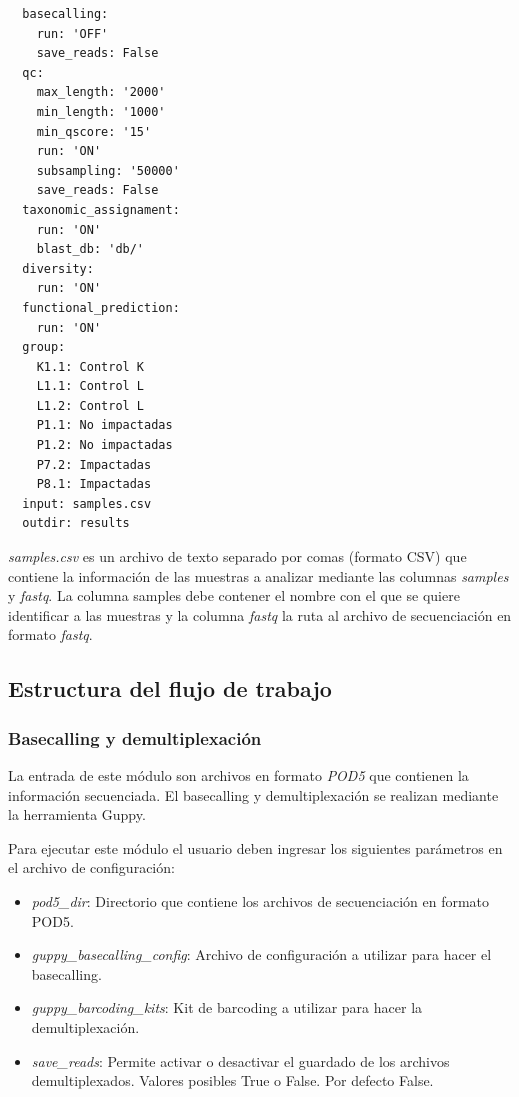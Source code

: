 
\begin{verbatim}
  basecalling:
    run: 'OFF'
    save_reads: False
  qc:
    max_length: '2000'
    min_length: '1000'
    min_qscore: '15'
    run: 'ON'
    subsampling: '50000'
    save_reads: False
  taxonomic_assignament:
    run: 'ON'
    blast_db: 'db/'
  diversity:
    run: 'ON'
  functional_prediction:
    run: 'ON'
  group:
    K1.1: Control K
    L1.1: Control L
    L1.2: Control L
    P1.1: No impactadas
    P1.2: No impactadas
    P7.2: Impactadas
    P8.1: Impactadas
  input: samples.csv
  outdir: results
\end{verbatim}
\label{verb:config}

\textit{samples.csv} es un archivo de texto separado por comas (formato CSV) que contiene la información de las muestras a analizar mediante las columnas \textit{samples} y \textit{fastq}. 
La columna samples debe contener el nombre con el que se quiere identificar a las muestras y la columna \textit{fastq} la ruta al archivo de secuenciación en formato \textit{fastq}.

\subsection{Estructura del flujo de trabajo}

\subsubsection{Basecalling y demultiplexación}
La entrada de este módulo son archivos en formato \textit{POD5} que contienen la información secuenciada.
El basecalling y demultiplexación se realizan mediante la herramienta Guppy.

Para ejecutar este módulo el usuario deben ingresar los siguientes parámetros en el archivo de configuración:
\begin{itemize}
    \item \textit{pod5\_dir}: Directorio que contiene los archivos de secuenciación en formato POD5.
    \item \textit{guppy\_basecalling\_config}: Archivo de configuración a utilizar para hacer el basecalling.
    \item \textit{guppy\_barcoding\_kits}: Kit de barcoding a utilizar para hacer la demultiplexación.
    \item \textit{save\_reads}: Permite activar o desactivar el guardado de los archivos demultiplexados. Valores posibles True o False. Por defecto False.
\end{itemize} 

